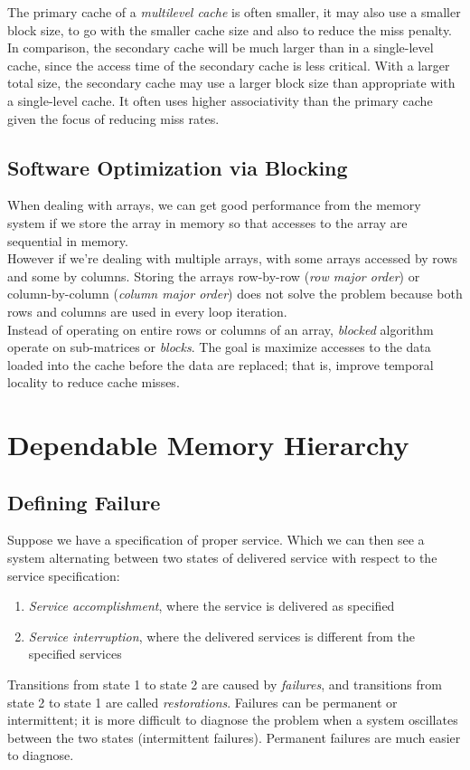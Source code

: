 \documentclass[12pt]{article}
\theoremstyle{definition}
\begin{document}
  The primary cache of a \emph{multilevel cache} is often smaller, it may also use a smaller block size, to go with the smaller cache size and also to reduce the miss penalty. \\
  In comparison, the secondary cache will be much larger than in a single-level cache, since the access time of the secondary cache is less critical.
  With a larger total size, the secondary cache may use a larger block size than appropriate with a single-level cache.
  It often uses higher associativity than the primary cache given the focus of reducing miss rates.

  \subsection{Software Optimization via Blocking}
  When dealing with arrays, we can get good performance from the memory system if we store the array in memory so that accesses to the array are sequential in memory. \\
  However if we're dealing with multiple arrays, with some arrays accessed by rows and some by columns.
  Storing the arrays row-by-row (\emph{row major order}) or column-by-column (\emph{column major order}) does not solve the problem because both rows and columns are used in every loop iteration. \\

  Instead of operating on entire rows or columns of an array, \emph{blocked} algorithm operate on sub-matrices or \emph{blocks}.
  The goal is maximize accesses to the data loaded into the cache before the data are replaced;
  that is, improve temporal locality to reduce cache misses.

  \section{Dependable Memory Hierarchy}
  \subsection{Defining Failure}
  Suppose we have a specification of proper service.
  Which we can then see a system alternating between two states of delivered service with respect to the service specification:
  \begin{enumerate}
    \item \emph{Service accomplishment}, where the service is delivered as specified
    \item \emph{Service interruption}, where the delivered services is different from the specified services
  \end{enumerate}
  Transitions from state 1 to state 2 are caused by \emph{failures}, and transitions from state 2 to state 1 are called \emph{restorations}.
  Failures can be permanent or intermittent;
  it is more difficult to diagnose the problem when a system oscillates between the two states (intermittent failures).
  Permanent failures are much easier to diagnose. \\
\end{document}
